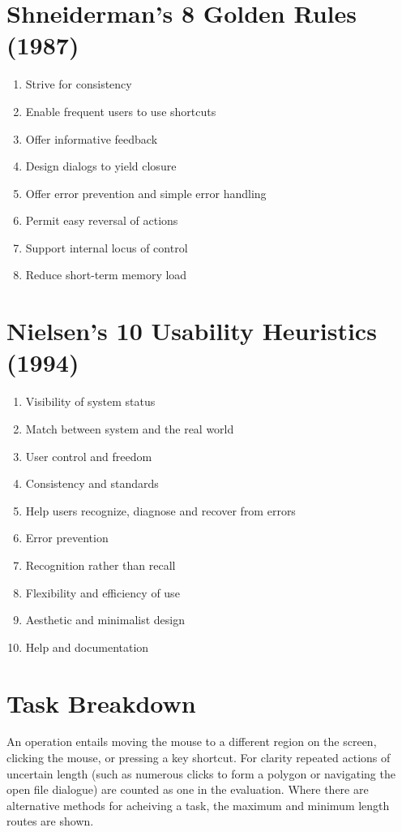 \documentclass[a4paper,11pt,oneside]{article}
\begin{document}
\section{Shneiderman’s 8 Golden Rules (1987)}
\label{sec:s_rules}
\begin{enumerate}
    \item Strive for consistency
    \item Enable frequent users to use shortcuts
    \item Offer informative feedback
    \item Design dialogs to yield closure
    \item Offer error prevention and simple error handling
    \item Permit easy reversal of actions
    \item Support internal locus of control
    \item Reduce short-term memory load 
\end{enumerate}

\section{Nielsen’s 10 Usability Heuristics (1994)}
\label{sec:n_rules}
\begin{enumerate}
    \item Visibility of system status
    \item Match between system and the real world
    \item User control and freedom
    \item Consistency and standards
    \item Help users recognize, diagnose and recover from errors
    \item Error prevention
    \item Recognition rather than recall
    \item Flexibility and efficiency of use
    \item Aesthetic and minimalist design
    \item Help and documentation
\end{enumerate}

\section{Task Breakdown}
\label{sec:task_breakdown}

An operation entails moving the mouse to a different region on the screen, clicking the mouse, or pressing a key shortcut. For clarity repeated actions of uncertain length (such as numerous clicks to form a polygon or navigating the open file dialogue) are counted as one in the evaluation. Where there are alternative methods for acheiving a task, the maximum and minimum length routes are shown.\\
\end{document}

